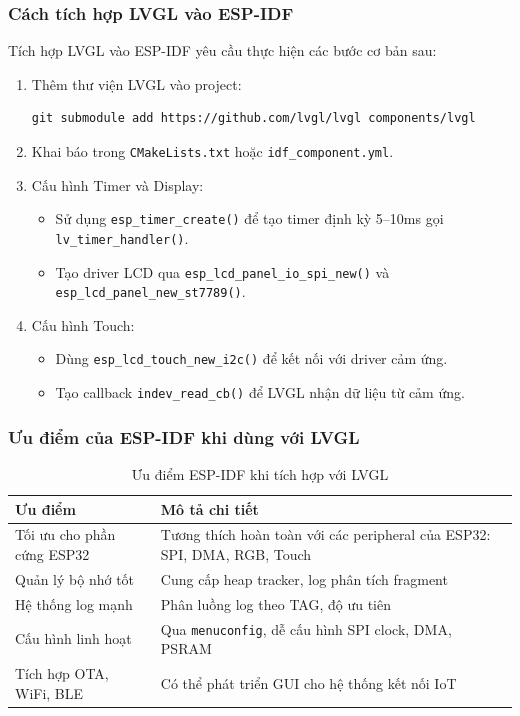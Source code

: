 \subsubsection{Cách tích hợp LVGL vào ESP-IDF}
Tích hợp LVGL vào ESP-IDF yêu cầu thực hiện các bước cơ bản sau:
\begin{enumerate}
    \item Thêm thư viện LVGL vào project:
\begin{verbatim}
git submodule add https://github.com/lvgl/lvgl components/lvgl
\end{verbatim}
    \item Khai báo trong \texttt{CMakeLists.txt} hoặc \texttt{idf\_component.yml}.
    \item Cấu hình Timer và Display:
    \begin{itemize}
        \item Sử dụng \texttt{esp\_timer\_create()} để tạo timer định kỳ 5--10ms gọi \texttt{lv\_timer\_handler()}.
        \item Tạo driver LCD qua \texttt{esp\_lcd\_panel\_io\_spi\_new()} và \texttt{esp\_lcd\_panel\_new\_st7789()}.
    \end{itemize}
    \item Cấu hình Touch:
    \begin{itemize}
        \item Dùng \texttt{esp\_lcd\_touch\_new\_i2c()} để kết nối với driver cảm ứng.
        \item Tạo callback \texttt{indev\_read\_cb()} để LVGL nhận dữ liệu từ cảm ứng.
    \end{itemize}
\end{enumerate}

\subsubsection{Ưu điểm của ESP-IDF khi dùng với LVGL}

\begin{table}[H]
\centering
\begin{tabular}{|l|p{10cm}|}
\hline
\textbf{Ưu điểm} & \textbf{Mô tả chi tiết} \\
\hline
Tối ưu cho phần cứng ESP32 & Tương thích hoàn toàn với các peripheral của ESP32: SPI, DMA, RGB, Touch \\
Quản lý bộ nhớ tốt & Cung cấp heap tracker, log phân tích fragment \\
Hệ thống log mạnh & Phân luồng log theo TAG, độ ưu tiên \\
Cấu hình linh hoạt & Qua \texttt{menuconfig}, dễ cấu hình SPI clock, DMA, PSRAM \\
Tích hợp OTA, WiFi, BLE & Có thể phát triển GUI cho hệ thống kết nối IoT \\
\hline
\end{tabular}
\caption{Ưu điểm ESP-IDF khi tích hợp với LVGL}
\end{table}

